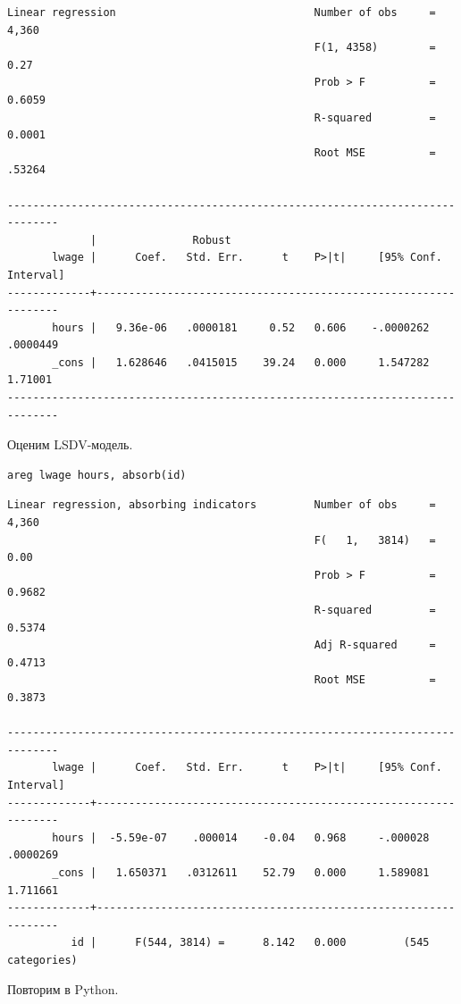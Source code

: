 \documentclass[]{book}
\begin{document}
\begin{verbatim}
Linear regression                               Number of obs     =      4,360
                                                F(1, 4358)        =       0.27
                                                Prob > F          =     0.6059
                                                R-squared         =     0.0001
                                                Root MSE          =     .53264

------------------------------------------------------------------------------
             |               Robust
       lwage |      Coef.   Std. Err.      t    P>|t|     [95% Conf. Interval]
-------------+----------------------------------------------------------------
       hours |   9.36e-06   .0000181     0.52   0.606    -.0000262    .0000449
       _cons |   1.628646   .0415015    39.24   0.000     1.547282     1.71001
------------------------------------------------------------------------------
\end{verbatim}

Оценим LSDV-модель.

\begin{verbatim}
areg lwage hours, absorb(id)
\end{verbatim}

\begin{verbatim}
Linear regression, absorbing indicators         Number of obs     =      4,360
                                                F(   1,   3814)   =       0.00
                                                Prob > F          =     0.9682
                                                R-squared         =     0.5374
                                                Adj R-squared     =     0.4713
                                                Root MSE          =     0.3873

------------------------------------------------------------------------------
       lwage |      Coef.   Std. Err.      t    P>|t|     [95% Conf. Interval]
-------------+----------------------------------------------------------------
       hours |  -5.59e-07    .000014    -0.04   0.968     -.000028    .0000269
       _cons |   1.650371   .0312611    52.79   0.000     1.589081    1.711661
-------------+----------------------------------------------------------------
          id |      F(544, 3814) =      8.142   0.000         (545 categories)
\end{verbatim}

Повторим в Python.
\end{document}
